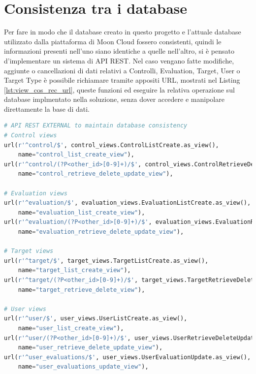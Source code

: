 \section*{Consistenza tra i database}
Per fare in modo che il database creato in questo progetto e l'attuale database utilizzato dalla piattaforma di Moon Cloud 
fossero consistenti, quindi le informazioni presenti nell'uno siano identiche a quelle nell'altro, si è 
pensato d'implementare un sistema di API REST.\hfill\break
Nel caso vengano fatte modifiche, aggiunte o cancellazioni di dati relativi a Controlli, Evaluation, Target, User o Target Type 
è possibile richiamare tramite appositi URL, mostrati nel Listing \ref{lst:view_cos_rec_url}, queste funzioni ed eseguire la relativa 
operazione sul database implmentato nella soluzione, senza dover accedere e manipolare direttamente la base di dati.
\lstset{style=python_code_style}
\begin{lstlisting}[language=Python, label=lst:view_cos_rec_url, caption={Porzione di codice dell'URL Mapper contenti le URL usate per 
    mantenere la consistenza dei dati.}]
# API REST EXTERNAL to maintain database consistency
# Control views
url(r'^control/$', control_views.ControlListCreate.as_view(),
    name="control_list_create_view"),
url(r'^control/(?P<other_id>[0-9]+)/$', control_views.ControlRetrieveDeleteUpdate.as_view(),
    name="control_retrieve_delete_update_view"),
 
# Evaluation views
url(r'^evaluation/$', evaluation_views.EvaluationListCreate.as_view(),
    name="evaluation_list_create_view"),
url(r'^evaluation/(?P<other_id>[0-9]+)/$', evaluation_views.EvaluationRetrieveDeleteUpdate.as_view(),
    name="evaluation_retrieve_delete_update_view"),
 
# Target views
url(r'^target/$', target_views.TargetListCreate.as_view(),
    name="target_list_create_view"),
url(r'^target/(?P<other_id>[0-9]+)/$', target_views.TargetRetrieveDelete.as_view(),
    name="target_retrieve_delete_view"),
 
# User views
url(r'^user/$', user_views.UserListCreate.as_view(),
    name="user_list_create_view"),
url(r'^user/(?P<other_id>[0-9]+)/$', user_views.UserRetrieveDeleteUpdate.as_view(),
    name="user_retrieve_delete_update_view"),
url(r'^user_evaluations/$', user_views.UserEvaluationUpdate.as_view(),
    name="user_evaluations_update_view"),
\end{lstlisting}
%
